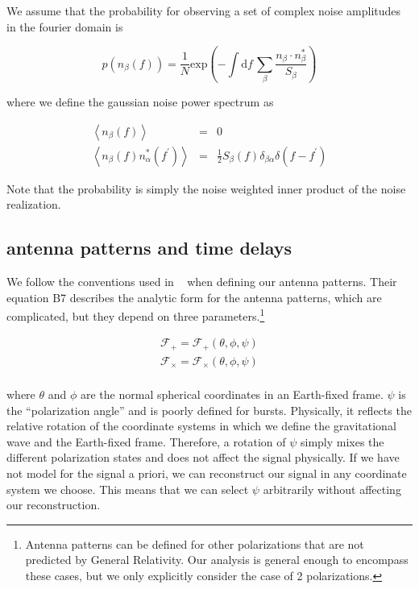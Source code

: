 \documentclass[10pt]{article}
\begin{document}
We assume that the probability for observing a set of complex noise amplitudes in the fourier domain is

\begin{equation}
p(n_\beta(f)) = \frac{1}{N}\mathrm{exp}\left( -\int\mathrm{d}f\, \sum_\beta \frac{n_\beta \cdot n_\beta^\ast}{S_\beta} \right)
\end{equation}

where we define the gaussian noise power spectrum as

\begin{eqnarray}
\left< n_\beta(f) \right> & = & 0 \\
\left< n_\beta(f) n_\alpha^\ast (f^\prime)\right> & = & \frac{1}{2} S_\beta(f) \delta_{\beta\alpha} \delta(f-f^\prime)
\end{eqnarray}

Note that the probability is simply the noise weighted inner product of the noise realization.

\subsection{antenna patterns and time delays}

We follow the conventions used in ~\cite{PhysRevD.63.042003} when defining our antenna patterns. Their equation B7 describes the analytic form for the antenna patterns, which are complicated, but they depend on three parameters.\footnote{Antenna patterns can be defined for other polarizations that are not predicted by General Relativity. Our analysis is general enough to encompass these cases, but we only explicitly consider the case of 2 polarizations.}

\begin{eqnarray}
\mathcal{F}_+ = \mathcal{F}_+(\theta,\phi,\psi) \nonumber\\
\mathcal{F}_\times = \mathcal{F}_\times(\theta,\phi,\psi) \nonumber\\
\end{eqnarray}

where $\theta$ and $\phi$ are the normal spherical coordinates in an Earth-fixed frame. $\psi$ is the ``polarization angle'' and is poorly defined for bursts. Physically, it reflects the relative rotation of the coordinate systems in which we define the gravitational wave and the Earth-fixed frame. Therefore, a rotation of $\psi$ simply mixes the different polarization states and does not affect the signal physically. If we have not model for the signal a priori, we can reconstruct our signal in any coordinate system we choose. This means that we can select $\psi$ arbitrarily without affecting our reconstruction.
\end{document}
